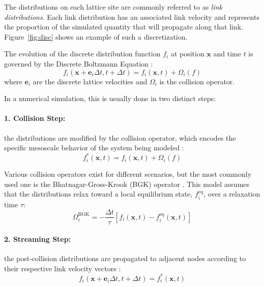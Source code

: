 The distributions on each lattice site are commonly referred to as \emph{link distributions}.
Each link distribution has an associated link velocity and represents the proportion of the simulated quantity that will propagate along that link.
Figure~\ref{fig:disc} shows an example of such a discretization.

The evolution of the discrete distribution function $f_i$ at position $\mathbf{x}$ and time $t$ is governed by the Discrete Boltzmann Equation \cite{kruger2016lattice}:
\begin{equation*}
    f_i(\mathbf{x} + \mathbf{e}_i \Delta t, t + \Delta t) = f_i(\mathbf{x}, t) + \Omega_i(f)
\end{equation*}
where $\mathbf{e}_i$ are the discrete lattice velocities and $\Omega_i$ is the collision operator.

In a numerical simulation, this is usually done in two distinct steps:

\paragraph{1. Collision Step:}
the distributions are modified by the collision operator, which encodes the specific mesoscale behavior of the system being modeled \cite{kruger2016lattice}:
\begin{equation*}
    f_i^*(\mathbf{x}, t) = f_i(\mathbf{x}, t) + \Omega_i(f)
\end{equation*}

Various collision operators exist for different scenarios, but the most commonly used one is the Bhatnagar-Gross-Krook (BGK) operator \cite{bhatnagar1954model}.
This model assumes that the distributions relax toward a local equilibrium state, $f_i^{\text{eq}}$, over a relaxation time $\tau$:
\begin{equation}
    \Omega_i^{\text{BGK}} = -\frac{\Delta t}{\tau} \left[ f_i(\mathbf{x}, t) - f_i^{\text{eq}}(\mathbf{x}, t) \right]
    \label{eq:bgk_operator}
\end{equation}

\paragraph{2. Streaming Step:}
the post-collision distributions are propagated to adjacent nodes according to their respective link velocity vectors \cite{kruger2016lattice}:
\begin{equation*}
    f_i(\mathbf{x} + \mathbf{e}_i \Delta t, t + \Delta t) = f_i^*(\mathbf{x}, t)
\end{equation*}

